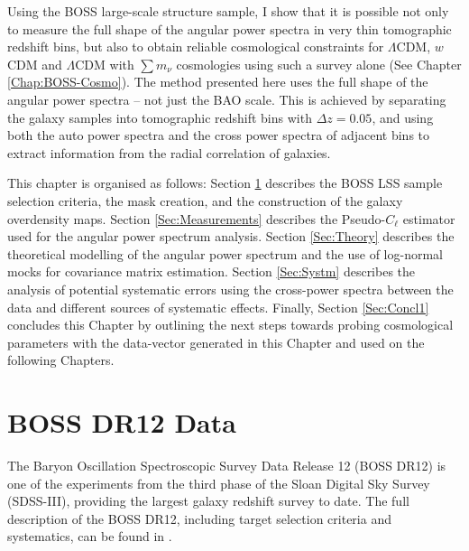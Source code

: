 \qquad Using the BOSS large-scale structure sample, I show that it is possible not only to measure the full shape of the angular power spectra in very thin tomographic redshift bins, but also to obtain reliable cosmological constraints for $\Lambda$CDM, $w$CDM and $\Lambda$CDM with $\sum m_{\nu}$ cosmologies using such a survey alone (See Chapter \ref{Chap:BOSS-Cosmo}). The method presented here uses the full shape of the angular power spectra -- not just the BAO scale. This is achieved by separating the galaxy samples into tomographic redshift bins with $\Delta z = 0.05$, and using both the auto power spectra and the cross power spectra of adjacent bins to extract information from the radial correlation of galaxies.%

\qquad This chapter is organised as follows: Section \ref{Sec:Data} describes the BOSS LSS sample selection criteria, the mask creation, and the construction of the galaxy overdensity maps. Section \ref{Sec:Measurements} describes the Pseudo-$C_{\ell}$ estimator used for the angular power spectrum analysis. Section \ref{Sec:Theory} describes the theoretical modelling of the angular power spectrum and the use of log-normal mocks for covariance matrix estimation. Section \ref{Sec:Systm} describes the analysis of potential systematic errors using the cross-power spectra between the data and different sources of systematic effects. Finally, Section \ref{Sec:Concl1} concludes this Chapter by outlining the next steps towards probing cosmological parameters with the data-vector generated in this Chapter and used on the following Chapters. %

\section{BOSS DR12 Data}\label{Sec:Data}
The Baryon Oscillation Spectroscopic Survey Data Release 12 (BOSS DR12) is one of the experiments from the third phase of the Sloan Digital Sky Survey (SDSS-III), providing the largest galaxy redshift survey to date. The full description of the BOSS DR12, including target selection criteria and systematics, can be found in \cite{BOSS2015}. 

